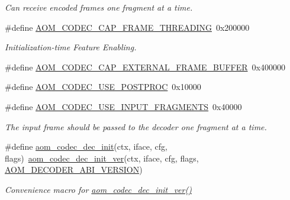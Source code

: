 \begin{DoxyCompactItemize}
\begin{DoxyCompactList}\small\item\em Can receive encoded frames one fragment at a time. \end{DoxyCompactList}\item 
\#define \hyperlink{group__decoder_ga0cf30c8046f3b6e909e4a366a57751df}{A\+O\+M\+\_\+\+C\+O\+D\+E\+C\+\_\+\+C\+A\+P\+\_\+\+F\+R\+A\+M\+E\+\_\+\+T\+H\+R\+E\+A\+D\+I\+NG}~0x200000
\begin{DoxyCompactList}\small\item\em Initialization-\/time Feature Enabling. \end{DoxyCompactList}\item 
\#define \hyperlink{group__decoder_gabd11df9f35d52ea76de2c8d32aa36963}{A\+O\+M\+\_\+\+C\+O\+D\+E\+C\+\_\+\+C\+A\+P\+\_\+\+E\+X\+T\+E\+R\+N\+A\+L\+\_\+\+F\+R\+A\+M\+E\+\_\+\+B\+U\+F\+F\+ER}~0x400000
\item 
\#define \hyperlink{group__decoder_ga7b6c145833964c9edd3ff78be017f7ec}{A\+O\+M\+\_\+\+C\+O\+D\+E\+C\+\_\+\+U\+S\+E\+\_\+\+P\+O\+S\+T\+P\+R\+OC}~0x10000
\item 
\#define \hyperlink{group__decoder_ga8bba07c9349375ba0b74b46a98ae79ea}{A\+O\+M\+\_\+\+C\+O\+D\+E\+C\+\_\+\+U\+S\+E\+\_\+\+I\+N\+P\+U\+T\+\_\+\+F\+R\+A\+G\+M\+E\+N\+TS}~0x40000\hypertarget{group__decoder_ga8bba07c9349375ba0b74b46a98ae79ea}{}\label{group__decoder_ga8bba07c9349375ba0b74b46a98ae79ea}

\begin{DoxyCompactList}\small\item\em The input frame should be passed to the decoder one fragment at a time. \end{DoxyCompactList}\item 
\#define \hyperlink{group__decoder_gafdbfca65b19ab1f6d72b32cd01753b9b}{aom\+\_\+codec\+\_\+dec\+\_\+init}(ctx,  iface,  cfg,  flags)~\hyperlink{group__decoder_gab2bfd2f5517b9452d2c71b7c2b2e8e8d}{aom\+\_\+codec\+\_\+dec\+\_\+init\+\_\+ver}(ctx, iface, cfg, flags, \hyperlink{group__decoder_ga23378c7ca8c361c097181aaaa2a5a734}{A\+O\+M\+\_\+\+D\+E\+C\+O\+D\+E\+R\+\_\+\+A\+B\+I\+\_\+\+V\+E\+R\+S\+I\+ON})
\begin{DoxyCompactList}\small\item\em Convenience macro for \hyperlink{group__decoder_gab2bfd2f5517b9452d2c71b7c2b2e8e8d}{aom\+\_\+codec\+\_\+dec\+\_\+init\+\_\+ver()} \end{DoxyCompactList}\end{DoxyCompactItemize}
